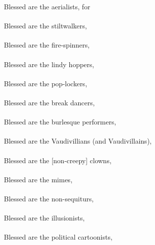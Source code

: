 \bverse Blessed are the aerialists, for\\
\\
\bverse Blessed are the stiltwalkers, \\
\\
\bverse Blessed are the fire-spinners, \\
\\
\bverse Blessed are the lindy hoppers, \\
\\
\bverse Blessed are the pop-lockers, \\
\\
\bverse Blessed are the break dancers, \\
\\
\bverse Blessed are the burlesque performers, \\
\\
\bverse Blessed are the Vaudivillians (and Vaudivillains), \\
\\
\bverse Blessed are the [non-creepy] clowns, \\
\\
\bverse Blessed are the mimes, \\
\\
\bverse Blessed are the non-sequiturs, \\
\\
\bverse Blessed are the illusionists, \\
\\
\bverse Blessed are the political cartoonists, \\
\newpage
